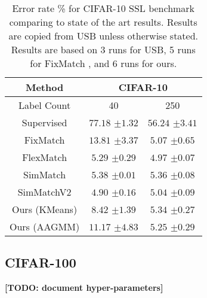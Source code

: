 \documentclass[10pt,twocolumn,letterpaper]{article}
\newcommand{\TODO}[1]{\textbf{\color{red}[TODO: #1]}}
\begin{document}
\begin{table}[htbp]
	\begin{tabular}{c|cc}
		Method          & \multicolumn{2}{c}{CIFAR-10} \\ \hline
		Label Count     & 40            & 250           \\
		Supervised & $77.18$ \scriptsize{$\pm1.32$}   & $56.24$ \scriptsize{$\pm3.41$}   \\ \hline
		FixMatch   & $13.81$ \scriptsize{$\pm3.37$}   & $5.07$ \scriptsize{$\pm0.65$}     \\
		FlexMatch  & $5.29$ \scriptsize{$\pm0.29$}    & $4.97$ \scriptsize{$\pm0.07$}    \\
		SimMatch   & $5.38$ \scriptsize{$\pm0.01$}    & $5.36$ \scriptsize{$\pm0.08$}    \\
		SimMatchV2 & $4.90$ \scriptsize{$\pm0.16$}    & $5.04$ \scriptsize{$\pm0.09$}    \\ \hline
		Ours (KMeans)    & $8.42$ \scriptsize{$\pm 1.39$}           & $5.34$ \scriptsize{$\pm 0.27$}       \\    
		Ours (AAGMM)    & $11.17$ \scriptsize{$\pm 4.83$}           & $5.25$ \scriptsize{$\pm 0.29$}           
	\end{tabular}
	\caption{Error rate \% for CIFAR-10 SSL benchmark comparing to state of the art results. Results are copied from USB \cite{wang2022usb} unless otherwise stated. Results are based on 3 runs for USB, 5 runs for FixMatch \cite{sohn2020fixmatch}, and 6 runs for ours.}
	\label{table2}
\end{table}



\subsection{CIFAR-100}

\TODO {document hyper-parameters}
\end{document}
